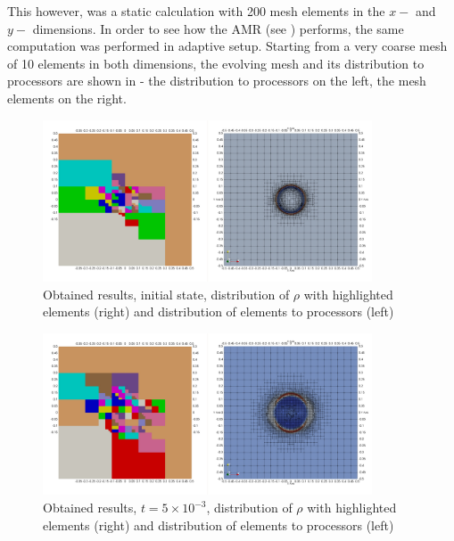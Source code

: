 This however, was a static calculation with 200 mesh elements in the $x-$ and $y-$ dimensions. In order to see how the AMR (see ) performs, the same computation was performed in adaptive setup. Starting from a very coarse mesh of 10 elements in both dimensions, the evolving mesh and its distribution to processors are shown in  - the distribution to processors on the left, the mesh elements on the right.

\begin{figure}[H]
	\begin{center}
		\includegraphics[width=0.87\textwidth]{img//mhd-blast/old/mya1.jpg}
	\caption{Obtained results, initial state, distribution of $\rho$ with highlighted elements (right) and distribution of elements to processors (left)}
	\label{figure:blastOldMyAdapt1}
	\end{center}
\end{figure}
\vspace{-8mm}

\begin{figure}[H]
	\begin{center}
		\includegraphics[width=0.87\textwidth]{img//mhd-blast/old/mya2.jpg}
	\caption{Obtained results, $t = 5\times 10^{-3}$, distribution of $\rho$ with highlighted elements (right) and distribution of elements to processors (left)}
	\label{figure:blastOldMyAdapt2}
	\end{center}
\end{figure}
\vspace{-8mm}


